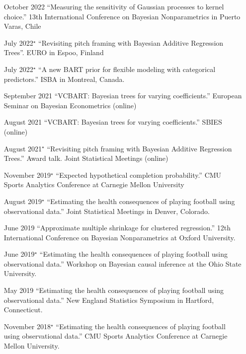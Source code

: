 \documentclass[margin]{res}
\begin{document}
\begin{resume}
\begin{itemize}
\item[October 2022]{``Measuring the sensitivity of Gaussian processes to kernel choice.'' 13th International Conference on Bayesian Nonparametrics in Puerto Varas, Chile}

\item[July 2022$^{\star}$]{``Revisiting pitch framing with Bayesian Additive Regression Trees''. EURO in Espoo, Finland}

\item[July 2022$^{\star}$]{``A new BART prior for flexible modeling with categorical predictors.'' ISBA in Montreal, Canada.}

\item[September 2021]{``VCBART: Bayesian trees for varying coefficients.'' European Seminar on Bayesian Econometrics (online)}

\item[August 2021]{``VCBART: Bayesian trees for varying coefficients.'' SBIES (online)}

\item[August 2021$^{\star}$]{``Revisiting pitch framing with Bayesian Additive Regression Trees.'' Award talk. Joint Statistical Meetings (online)}

\item[November 2019$^{\star}$]{``Expected hypothetical completion probability.'' CMU Sports Analytics Conference at Carnegie Mellon University}

\item[August 2019$^{\star}$]{``Estimating the health consequences of playing football using observational data.'' Joint Statistical Meetings in Denver, Colorado.}

\item[June 2019]{``Approximate multiple shrinkage for clustered regression.'' 12th International Conference on Bayesian Nonparametrics at Oxford University.}

\item[June 2019$^{\star}$]{``Estimating the health consequences of playing football using observational data.'' Workshop on Bayesian causal inference at the Ohio State University.}

\item[May 2019]{``Estimating the health consequences of playing football using observational data.'' New England Statistics Symposium in Hartford, Connecticut.}

\item[November 2018$^{\star}$]{``Estimating the health consequences of playing football using observational data.'' CMU Sports Analytics Conference at Carnegie Mellon University.}


\end{itemize}
\end{resume}
\end{document}
